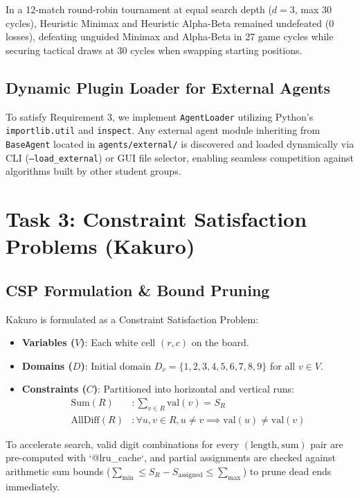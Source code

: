 \documentclass[conference]{IEEEtran}
\begin{document}
In a 12-match round-robin tournament at equal search depth ($d=3$, max 30 cycles), Heuristic Minimax and Heuristic Alpha-Beta remained undefeated (0 losses), defeating unguided Minimax and Alpha-Beta in 27 game cycles while securing tactical draws at 30 cycles when swapping starting positions.

\subsection{Dynamic Plugin Loader for External Agents}
To satisfy Requirement 3, we implement \texttt{AgentLoader} utilizing Python's \texttt{importlib.util} and \texttt{inspect}. Any external agent module inheriting from \texttt{BaseAgent} located in \texttt{agents/external/} is discovered and loaded dynamically via CLI (\texttt{--load\_external}) or GUI file selector, enabling seamless competition against algorithms built by other student groups.

\section{Task 3: Constraint Satisfaction Problems (Kakuro)}

\subsection{CSP Formulation \& Bound Pruning}
Kakuro is formulated as a Constraint Satisfaction Problem:
\begin{itemize}
    \item \textbf{Variables ($V$)}: Each white cell $(r, c)$ on the board.
    \item \textbf{Domains ($D$)}: Initial domain $D_v = \{1, 2, 3, 4, 5, 6, 7, 8, 9\}$ for all $v \in V$.
    \item \textbf{Constraints ($C$)}: Partitioned into horizontal and vertical runs:
    \begin{align}
        \text{Sum}(R) &: \sum_{v \in R} \text{val}(v) = S_R \\
        \text{AllDiff}(R) &: \forall u, v \in R, u \ne v \implies \text{val}(u) \ne \text{val}(v)
    \end{align}
\end{itemize}

To accelerate search, valid digit combinations for every $(\text{length}, \text{sum})$ pair are pre-computed with `@lru_cache`, and partial assignments are checked against arithmetic sum bounds ($\sum_{\min} \le S_R - S_{\text{assigned}} \le \sum_{\max}$) to prune dead ends immediately.
\end{document}
